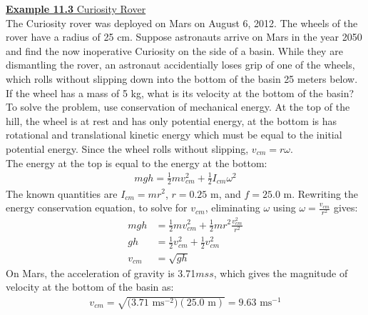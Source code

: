 \documentclass[a4paper]{article}
\let\bf\textbf
\newcommand\m{\text{ m}}
\newcommand\ms{\text{ ms}^{-1}}
\newcommand\mss{\text{ ms}^{-2}}
\begin{document}
\begin{shaded}
    \underline{\bf{Example 11.3} Curiosity Rover}
    \vspace{2mm}\\
    The Curiosity rover was deployed on Mars on August 6, 2012. The wheels of the rover have a radius of 25 cm. Suppose astronauts arrive on Mars in the year 2050 and find the now inoperative Curiosity on the side of a basin. While they are dismantling the rover, an astronaut accidentially loses grip of one of the wheels, which rolls without slipping down into the bottom of the basin 25 meters below. If the wheel has a mass of 5 kg, what is its velocity at the bottom of the basin?\vspace{1mm}\\
    To solve the problem, use conservation of mechanical energy. At the top of the hill, the wheel is at rest and has only potential energy, at the bottom is has rotational and translational kinetic energy which must be equal to the initial potential energy. Since the wheel rolls without slipping, $v_{cm} = r\omega$.
    \vspace{1mm}\\
    The energy at the top is equal to the energy at the bottom:
    \begin{align*}
        mgh = \frac{1}{2}mv_{cm}^2 + \frac{1}{2}I_{cm}\omega^2
    \end{align*}
    The known quantities are $I_{cm} = mr^2$, $r = 0.25$ m, and $f = 25.0$ m. Rewriting the energy conservation equation, to solve for $v_{cm}$, eliminating $\omega$ using $\omega = \frac{v_{cm}}{r^2}$ gives:
    \begin{align*}
        mgh &= \frac{1}{2}mv_{cm}^2 + \frac{1}{2}mr^2\frac{v_{cm}^2}{r^2}\\
        gh &= \frac{1}{2}v_{cm}^2 + \frac{1}{2}v_{cm}^2\\
        v_{cm} &= \sqrt{gh}
    \end{align*}
    On Mars, the acceleration of gravity is 3.71$mss$, which gives the magnitude of velocity at the bottom of the basin as:
    \begin{align*}
        v_{cm} = \sqrt{\big(3.71\mss\big)(25.0\m)} = 9.63\ms
    \end{align*}
\end{shaded}
\end{document}
